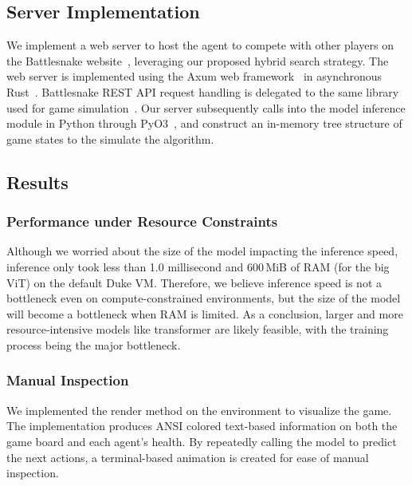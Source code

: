 \documentclass[conference]{IEEEtran}
\newcommand{\todo}[1]{\textcolor{red}{[ #1 ]}}
\renewcommand{\todo}[1]{} %
\begin{document}
\subsection{Server Implementation}

We implement a web server to host the agent to compete with other players on the
Battlesnake website~\cite{battlesnake},
leveraging our proposed hybrid search strategy.
The web server is implemented using the Axum web framework~\cite{axum}
in asynchronous Rust~\cite{tokio}.
Battlesnake REST API request handling is delegated to the same library used for
game simulation~\cite{wrenger2024rusty}.
Our server subsequently calls into the model inference module in Python through
PyO3~\cite{pyo3},
and construct an in-memory tree structure of game states to the simulate the
algorithm.

\todo{demonstrate the corresponding experimental results}

\subsection{Results}

\subsubsection{Performance under Resource Constraints}

Although we worried about the size of the model impacting the inference speed,
inference only took less than 1.0 millisecond and 600\,MiB of RAM (for the big
ViT) on the default Duke VM. Therefore,
we believe inference speed is not a bottleneck even on compute-constrained
environments,
but the size of the model will become a bottleneck when RAM is limited.
As a conclusion,
larger and more resource-intensive models like transformer are likely feasible,
with the training process being the major bottleneck.

\subsubsection{Manual Inspection}\label{sec:manual-inspection}

We implemented the \textsf{render}
method on the environment to visualize the game.
The implementation produces ANSI colored text-based information on both the game
board and each agent's health.
By repeatedly calling the model to predict the next actions,
a terminal-based animation is created for ease of manual inspection.
\end{document}
